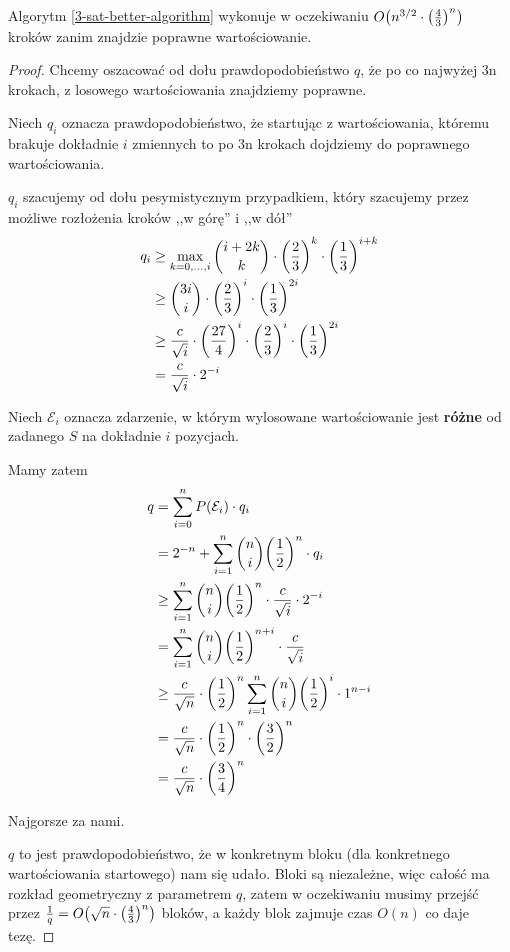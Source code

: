 \begin{theorem}
    Algorytm \ref{3-sat-better-algorithm} wykonuje w oczekiwaniu \( O\pars{n^{3/2} \cdot \pars{\frac{4}{3}}^n} \) kroków zanim znajdzie poprawne wartościowanie.
\end{theorem}
\begin{proof}
Chcemy oszacować od dołu prawdopodobieństwo \( q \), że po co najwyżej 3n krokach, z losowego wartościowania znajdziemy poprawne.

Niech \( q_i \) oznacza prawdopodobieństwo, że startując z wartościowania, któremu brakuje dokładnie \( i \) zmiennych to po 3n krokach dojdziemy do poprawnego wartościowania.

\( q_i\) szacujemy od dołu pesymistycznym przypadkiem, który szacujemy przez możliwe rozłożenia kroków ,,w górę'' i ,,w dół'' 
\begin{align*}
    q_i 
        &\geq \max_{k = 0, \dots, i} \binom{i + 2k}{k} \cdot \left(\frac{2}{3}\right)^k\cdot\left(\frac{1}{3}\right)^{i + k} \\
        &\geq \binom{3i}{i} \cdot \left(\frac{2}{3}\right)^i\cdot\left(\frac{1}{3}\right)^{2i} \\
        &\geq \frac{c}{\sqrt{i}}\cdot \left(\frac{27}{4}\right)^i \cdot \left(\frac{2}{3}\right)^i\cdot\left(\frac{1}{3}\right)^{2i} \\
        &= \frac{c}{\sqrt{i}}\cdot2^{-i}
\end{align*}

Niech \( \mathcal{E}_i \) oznacza zdarzenie, w którym wylosowane wartościowanie jest \textbf{różne} od zadanego \( S \) na dokładnie \( i \) pozycjach.


Mamy zatem
\begin{align*}
    q 
        &= \sum_{i=0}^n P(\mathcal{E}_i) \cdot q_i \\
        &= 2^{-n} + \sum_{i=1}^n \binom{n}{i}\pars{\frac{1}{2}}^n \cdot q_i \\
        &\geq \sum_{i=1}^n \binom{n}{i}\pars{\frac{1}{2}}^n \cdot \frac{c}{\sqrt{i}}\cdot2^{-i} \\
        &= \sum_{i=1}^n \binom{n}{i}\pars{\frac{1}{2}}^{n+i} \cdot \frac{c}{\sqrt{i}} \\
        &\geq \frac{c}{\sqrt{n}} \cdot \pars{\frac{1}{2}}^n \sum_{i=1}^n \binom{n}{i}\pars{\frac{1}{2}}^i \cdot 1^{n-i} \\
        &= \frac{c}{\sqrt{n}} \cdot \pars{\frac{1}{2}}^n \cdot \pars{\frac{3}{2}}^n \\
        &= \frac{c}{\sqrt{n}} \cdot \pars{\frac{3}{4}}^n \\
\end{align*}

Najgorsze za nami.

\( q \) to jest prawdopodobieństwo, że w konkretnym bloku (dla konkretnego wartościowania startowego) nam się udało.
Bloki są niezależne, więc całość ma rozkład geometryczny z parametrem \( q \), 
zatem w oczekiwaniu musimy przejść przez \( \frac{1}{q} = O\pars{\sqrt{n} \cdot \pars{\frac{4}{3}}^n}\) bloków, a każdy blok zajmuje czas \( O(n) \) co daje tezę.
\end{proof}